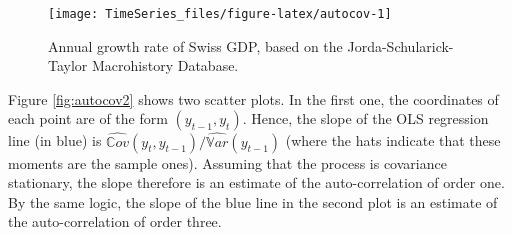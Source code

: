 \documentclass[
  12pt,
]{book}
\newenvironment{Shaded}{\begin{snugshade}}{\end{snugshade}}
\newcommand{\AttributeTok}[1]{\textcolor[rgb]{0.77,0.63,0.00}{#1}}
\newcommand{\ConstantTok}[1]{\textcolor[rgb]{0.00,0.00,0.00}{#1}}
\newcommand{\DecValTok}[1]{\textcolor[rgb]{0.00,0.00,0.81}{#1}}
\newcommand{\FunctionTok}[1]{\textcolor[rgb]{0.00,0.00,0.00}{#1}}
\newcommand{\NormalTok}[1]{#1}
\newcommand{\OtherTok}[1]{\textcolor[rgb]{0.56,0.35,0.01}{#1}}
\newcommand{\SpecialCharTok}[1]{\textcolor[rgb]{0.00,0.00,0.00}{#1}}
\newcommand{\StringTok}[1]{\textcolor[rgb]{0.31,0.60,0.02}{#1}}
\theoremstyle{definition}
\theoremstyle{definition}
\theoremstyle{definition}
\theoremstyle{definition}
\theoremstyle{remark}
\begin{document}
\begin{Shaded}
\end{Shaded}

\begin{figure}
\texttt{[image: TimeSeries\_files/figure-latex/autocov-1]} \caption{Annual growth rate of Swiss GDP, based on the Jorda-Schularick-Taylor Macrohistory Database.}\label{fig:autocov}
\end{figure}

Figure \ref{fig:autocov2} shows two scatter plots. In the first one, the coordinates of each point are of the form \((y_{t-1},y_t)\). Hence, the slope of the OLS regression line (in blue) is \(\widehat{\mathbb{C}ov}(y_t,y_{t-1})/\widehat{\mathbb{V}ar}(y_{t-1})\) (where the hats indicate that these moments are the sample ones). Assuming that the process is covariance stationary, the slope therefore is an estimate of the auto-correlation of order one. By the same logic, the slope of the blue line in the second plot is an estimate of the auto-correlation of order three.
\end{document}
